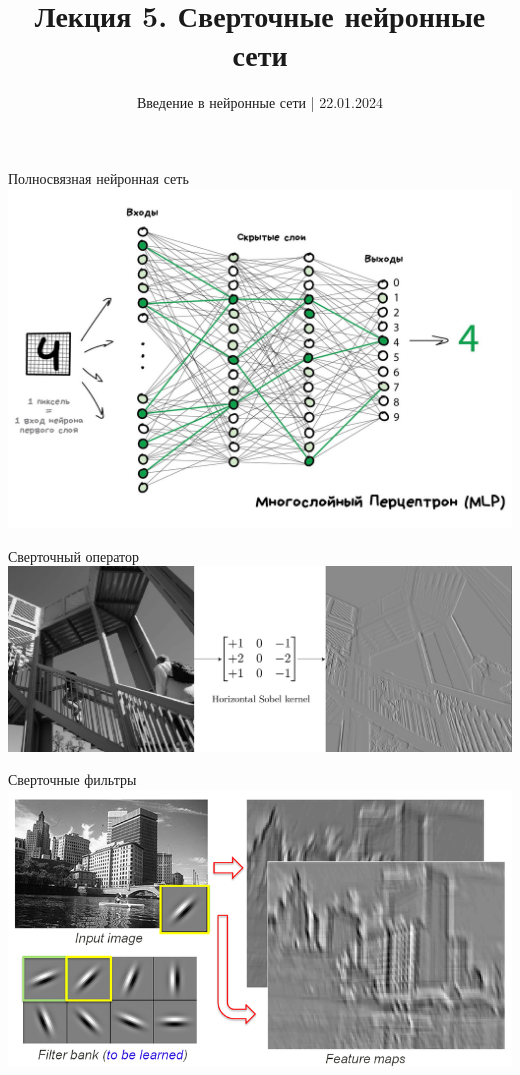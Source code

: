 \documentclass[aspectratio=169]{beamer}
\title{Лекция 5. Сверточные нейронные сети}
\date{Введение в нейронные сети | 22.01.2024}
\begin{document}
\maketitle

\begin{frame}{Полносвязная нейронная сеть}
    \centering
    \includegraphics[width=0.7\linewidth]{graphs/four_layers.jpg}
\end{frame}

\begin{frame}{Сверточный оператор}
    \centering
    \includegraphics[width=\linewidth]{graphs/sobel.png}
\end{frame}

\begin{frame}{Сверточные фильтры}
    \centering
    \includegraphics[width=0.85\linewidth]{graphs/conv_filter.png}
\end{frame}
\end{document}
